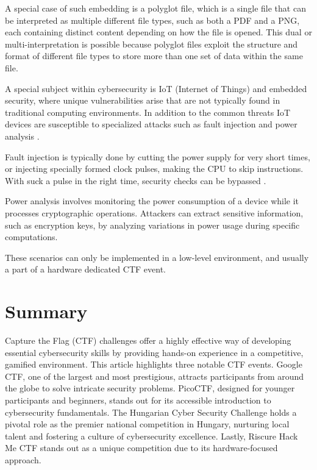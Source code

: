 \documentclass[conference]{IEEEtran}
\begin{document}
A special case of such embedding is a polyglot file, which is a single
file that can be interpreted as multiple different
file types, such as both a PDF and a PNG, each containing distinct content
depending on how the file is opened. This dual or multi-interpretation is
possible because polyglot files exploit the structure and format of different
file types to store more than one set of data within the same file.

A special subject within cybersecurity is IoT (Internet of Things) and embedded
security, where unique vulnerabilities arise that are not typically found in
traditional computing environments. In addition to the common threats IoT
devices are susceptible to
specialized attacks such as fault injection and power analysis
\cite{butun2019}.

Fault injection is typically done by cutting the power supply for very short
times, or injecting specially formed clock pulses, making the CPU to skip instructions.
With suck a pulse in the right time, security checks can be bypassed
\cite{ziade2004}.

Power analysis involves monitoring the power consumption of a device while it
processes cryptographic operations. Attackers can extract sensitive
information, such as encryption keys, by analyzing variations in power usage
during specific computations.

These scenarios can only be implemented in a low-level environment, 
and usually a part of a hardware dedicated CTF event.

\section{Summary}

Capture the Flag (CTF) challenges offer a highly effective way of developing
essential cybersecurity skills by providing hands-on experience in a
competitive, gamified environment. This article highlights three notable CTF
events. Google CTF, one of the largest and most prestigious, attracts
participants from around the globe to solve intricate security problems.
PicoCTF, designed for younger participants and beginners, stands out for its
accessible introduction to cybersecurity fundamentals. The Hungarian Cyber
Security Challenge holds a pivotal role as the premier national competition in
Hungary, nurturing local talent and fostering a culture of cybersecurity
excellence. Lastly, Riscure Hack Me CTF stands out as a unique competition due
to its hardware-focused approach. 
\end{document}
